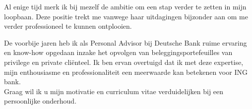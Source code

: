 \documentclass[11pt, a4paper]{awesome-cv} %
\begin{document}
\makecvheader %

\makelettertitle %


\begin{cvletter}



Al enige tijd merk ik bij mezelf de ambitie om een stap verder te zetten in mijn loopbaan. Deze positie trekt me vanwege haar uitdagingen  bijzonder aan om me verder professioneel te kunnen ontplooien. \newline

De voorbije jaren heb ik als Personal Advisor bij Deutsche Bank ruime ervaring en know-how opgedaan inzake het opvolgen van
beleggingsportefeuilles van privilege en private cliënteel. \newline
Ik ben ervan overtuigd dat ik met deze expertise, mijn enthousiasme en professionaliteit een meerwaarde kan betekenen
voor ING bank. \newline \\
Graag wil ik u mijn motivatie en curriculum vitae verduidelijken bij een persoonlijke onderhoud.

\end{cvletter}


\makeletterclosing %
\end{document}
